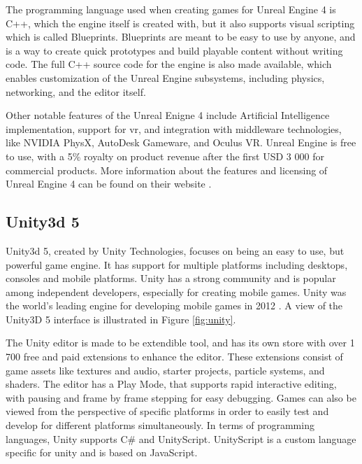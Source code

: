 
The programming language used when creating games for Unreal Engine 4 is C++, which the engine itself is created with, but it also supports visual scripting which is called Blueprints. Blueprints are meant to be easy to use by anyone, and is a way to create quick prototypes and build playable content without writing code. The full C++ source code for the engine is also made available, which enables customization of the Unreal Engine subsystems, including physics, networking, and the editor itself.

Other notable features of the Unreal Enigne 4 include Artificial Intelligence implementation, support for \gls{vr}, and integration with middleware technologies, like NVIDIA PhysX, AutoDesk Gameware, and Oculus VR. Unreal Engine is free to use, with a 5\% royalty on product revenue after the first USD 3 000 for commercial products. More information about the features and licensing of Unreal Engine 4 can be found on their website \cite{unreal2016engine}.


\subsection{Unity3d 5}
Unity3d 5, created by Unity Technologies, focuses on being an easy to use, but powerful game engine. It has support for multiple platforms including desktops, consoles and mobile platforms. Unity has a strong community and is popular among independent developers, especially for creating mobile games. Unity was the world's leading engine for developing mobile games in 2012 \cite{bratcher2013unity}. A view of the Unity3D 5 interface is illustrated in Figure \ref{fig:unity}.


The Unity editor is made to be extendible tool, and has its own store with over 1 700 free and paid extensions to enhance the editor. These extensions consist of game assets like textures and audio, starter projects, particle systems, and shaders. The editor has a Play Mode, that supports rapid interactive editing, with pausing and frame by frame stepping for easy debugging. Games can also be viewed from the perspective of specific platforms in order to easily test and develop for different platforms simultaneously. In terms of programming languages, Unity supports C\# and UnityScript. UnityScript is a custom language specific for unity and is based on JavaScript. \cite{unity2016editor, unity2016script}


